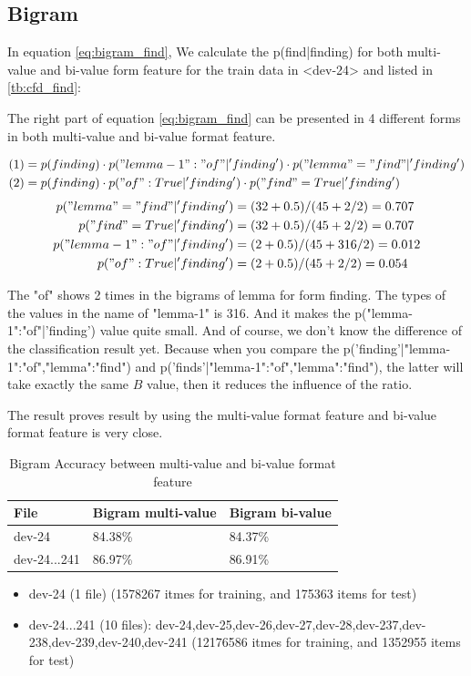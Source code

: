 \documentclass[a4paper]{article}
\begin{document}
\subsection*{Bigram}

In equation \ref{eq:bigram_find}, We calculate the p(find|finding) for both multi-value and bi-value form feature for the train data in <dev-24> and listed in \ref{tb:cfd_find}:

The right part of equation \ref{eq:bigram_find} can be presented in 4 different forms in both multi-value and bi-value format feature. 

\begin{align*}
&(1)=p(finding) \cdot p("lemma-1":"of"|'finding') \cdot p("lemma"="find"|'finding') \\
&(2)=p(finding) \cdot p("of":True|'finding') \cdot p("find"=True|'finding') 
\end{align*}
\begin{align*}
p("lemma"="find"|'finding') &= (32+0.5)/(45+2/2) = 0.707 \\
p("find"=True|'finding') &= (32+0.5)/(45+2/2) = 0.707 \\
p("lemma-1":"of"|'finding') &= (2+0.5)/(45+316/2) = 0.012 \\
p("of":True|'finding') &= (2+0.5)/(45+2/2) = 0.054 
\end{align*}

The "of" shows 2 times in the bigrams of lemma for form finding. The types of the values in the name of "lemma-1" is 316. And it makes the p("lemma-1":"of"|'finding') value quite small. 
And of course, we don't know the difference of the classification result yet. Because when you compare the p('finding'|"lemma-1":"of","lemma":"find") and p('finds'|"lemma-1":"of","lemma":"find"), the latter will take exactly the same $B$ value, then it reduces the influence of the ratio.

The result proves result by using the multi-value format feature and bi-value format feature is very close.


\begin{table}[]
\centering
\begin{tabular}{|l|l|l|}
\hline
File           & Bigram multi-value & Bigram bi-value \\ \hline
dev-24         & 84.38\%            & 84.37\%         \\ \hline
dev-24...241   & 86.97\%            & 86.91\%         \\ \hline
\end{tabular}
\caption{Bigram Accuracy between multi-value and bi-value format feature}
\label{bigram_nb}
\end{table}
\begin{itemize}
\item dev-24 (1 file) (1578267 itmes for training, and 175363 items for test)
\item dev-24...241 (10 files): dev-24,dev-25,dev-26,dev-27,dev-28,dev-237,dev-238,dev-239,dev-240,dev-241 (12176586 itmes for training, and 1352955 items for test)
\end{itemize}
\end{document}
